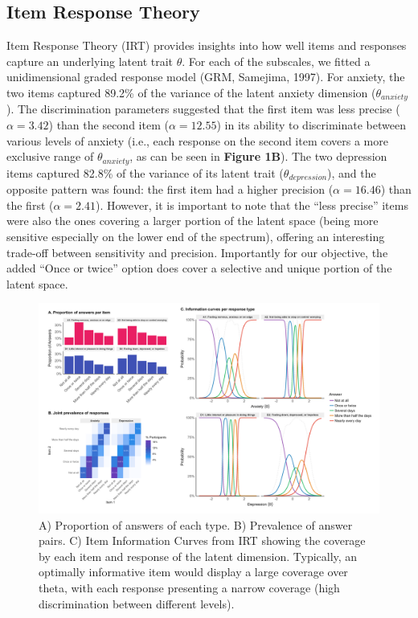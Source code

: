 \documentclass[
  man,floatsintext]{apa6}
\begin{document}
\hypertarget{item-response-theory}{%
\subsection{Item Response Theory}\label{item-response-theory}}

Item Response Theory (IRT) provides insights into how well items and responses capture an underlying latent trait \(\theta\). For each of the subscales, we fitted a unidimensional graded response model (GRM, Samejima, 1997). For anxiety, the two items captured 89.2\% of the variance of the latent anxiety dimension (\(\theta_{anxiety}\)). The discrimination parameters suggested that the first item was less precise (\(\alpha = 3.42\)) than the second item (\(\alpha = 12.55\)) in its ability to discriminate between various levels of anxiety (i.e., each response on the second item covers a more exclusive range of \(\theta_{anxiety}\), as can be seen in \textbf{Figure 1B}). The two depression items captured 82.8\% of the variance of its latent trait (\(\theta_{depression}\)), and the opposite pattern was found: the first item had a higher precision (\(\alpha = 16.46\)) than the first (\(\alpha = 2.41\)). However, it is important to note that the ``less precise'' items were also the ones covering a larger portion of the latent space (being more sensitive especially on the lower end of the spectrum), offering an interesting trade-off between sensitivity and precision. Importantly for our objective, the added ``Once or twice'' option does cover a selective and unique portion of the latent space.

\begin{figure}
\includegraphics[width=1\linewidth]{../../figures/figure1} \caption{A) Proportion of answers of each type. B) Prevalence of answer pairs. C) Item Information Curves from IRT showing the coverage by each item and response of the latent dimension. Typically, an optimally informative item would display a large coverage over theta, with each response presenting a narrow coverage (high discrimination between different levels).}\label{fig:unnamed-chunk-2}
\end{figure}
\end{document}
